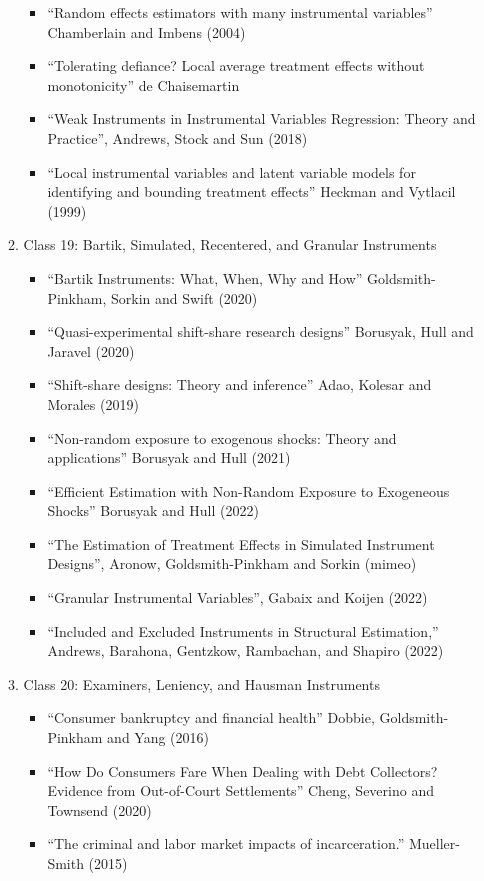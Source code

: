 \documentclass[11pt, a4paper]{article}
\begin{document}
\begin{enumerate}
\begin{enumerate}
\begin{itemize}
    \item ``Random effects estimators with many instrumental variables'' Chamberlain and Imbens (2004)
    \item ``Tolerating defiance? Local average treatment effects without monotonicity'' de Chaisemartin
    \item ``Weak Instruments in Instrumental Variables Regression: Theory and Practice'', Andrews, Stock and Sun (2018)
    \item ``Local instrumental variables and latent variable models for identifying and bounding treatment effects'' Heckman and  Vytlacil (1999)
    \end{itemize}
  \item Class 19: Bartik, Simulated, Recentered, and Granular Instruments
    \begin{itemize}
    \item ``Bartik Instruments: What, When, Why and How'' Goldsmith-Pinkham, Sorkin and Swift (2020)
    \item ``Quasi-experimental shift-share research designs'' Borusyak, Hull and Jaravel (2020)
    \item ``Shift-share designs: Theory and inference'' Adao, Kolesar and Morales (2019)
    \item ``Non-random exposure to exogenous shocks: Theory and applications'' Borusyak and Hull (2021)
    \item ``Efficient Estimation with Non-Random Exposure to Exogeneous Shocks'' Borusyak and Hull (2022)
    \item ``The Estimation of Treatment Effects in Simulated Instrument Designs'', Aronow, Goldsmith-Pinkham and Sorkin (mimeo)
    \item ``Granular Instrumental Variables'', Gabaix and Koijen (2022)
    \item ``Included and Excluded Instruments in Structural Estimation,'' Andrews, Barahona, Gentzkow, Rambachan, and Shapiro (2022)
    \end{itemize}
  \item Class 20: Examiners, Leniency, and Hausman Instruments
    \begin{itemize}
    \item ``Consumer bankruptcy and financial health'' Dobbie, Goldsmith-Pinkham and Yang (2016)
    \item ``How Do Consumers Fare When Dealing with Debt Collectors? Evidence from Out-of-Court Settlements'' Cheng, Severino and Townsend (2020)
    \item ``The criminal and labor market impacts of incarceration.'' Mueller-Smith (2015)

\end{itemize}
\end{enumerate}
\end{enumerate}
\end{document}
